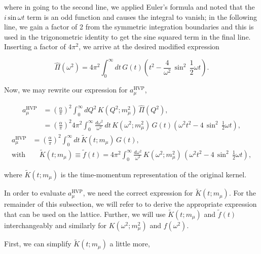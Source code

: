 \documentclass{article}
\numberwithin{equation}{section} %
\begin{document}
\noindent where in going to the second line, we applied Euler's formula and noted that the $i\, \mathrm{sin\,}\omega t$ term is an odd function and causes the integral to vanish; in the following line, we gain a factor of 2 from the symmetric integration boundaries and this is used in the trigonometric identity to get the sine squared term in the final line. Inserting a factor of $4\pi^2$, we arrive at the desired modified expression

\begin{equation}
\hat{\Pi}(\omega^2) = 4\pi^2\int^\infty_0 dt\, G(t) \left( t^2-\frac{4}{\omega^2}\,\sin^2\, \frac{1}{2}\omega t \right).
\end{equation}

Now, we may rewrite our expression for $a_\mu^\mathrm{HVP}$,

\begin{equation}
\begin{split}
a_\mu^\mathrm{HVP} &= \left(\frac{\alpha}{\pi}\right)^2 \int_0^\infty dQ^2 \, K(Q^2;m_\mu^2) \,\hat{\Pi}(Q^2),\\
&= \left(\frac{\alpha}{\pi}\right)^2 4\pi^2  \int_0^\infty \frac{d\omega^2}{\omega^2} \, dt\, K(\omega^2;m_\mu^2) \,G(t) \left( \omega^2 t^2-4\,\sin^2\, \frac{1}{2}\omega t \right),
\end{split}
\end{equation}
\begin{equation}
\begin{split}
a_\mu^\mathrm{HVP}&= \left(\frac{\alpha}{\pi}\right)^2  \int_0^\infty dt\, \tilde{K}(t;m_\mu) \,G(t) ,\\
\mathrm{with}& \quad \tilde{K}(t;m_\mu) \equiv \tilde{f}(t) = 4\pi^2 \int_0^\infty \frac{d\omega^2}{\omega^2} \, K(\omega^2;m_\mu^2) \,\left( \omega^2t^2-4\,\sin^2\, \frac{1}{2}\omega t \right),
\end{split}
\label{amu}
\end{equation}

\noindent where $\tilde{K}(t;m_\mu)$ is the time-momentum representation of the original kernel.

In order to evaluate $a_\mu^\mathrm{HVP}$, we need the correct expression for $\tilde{K}(t;m_\mu)$. For the remainder of this subsection, we will refer to \cite{dellamorte} to derive the appropriate expression that can be used on the lattice. Further, we will use $\tilde{K}(t;m_\mu)$ and $\tilde{f}(t)$ interchangeably and similarly for $K(\omega^2;m_\mu^2)$ and $f(\omega^2)$. 

First, we can simplify $\tilde{K}(t;m_\mu)$ a little more,
\end{document}
